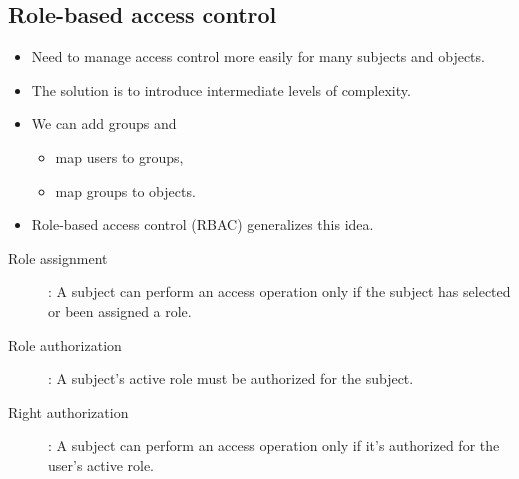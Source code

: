 \subsection{Role-based access control}

\begin{frame}
  \begin{idea}
    \begin{itemize}
      \item Need to manage access control more easily for many subjects and 
        objects.

      \item The solution is to introduce intermediate levels of complexity.

        \pause

      \item We can add groups and
        \begin{itemize}
          \item map users to groups,
          \item map groups to objects.
        \end{itemize}
    \end{itemize}
  \end{idea}
\end{frame}

\begin{frame}
  \begin{remark}
    \begin{itemize}
      \item Role-based access control (RBAC) generalizes this idea.
    \end{itemize}
  \end{remark}
  
  \begin{definition}[RBAC]
    \begin{description}
      \item[Role assignment]: A subject can perform an access operation only if 
        the subject has selected or been assigned a role.

      \item[Role authorization]: A subject's active role must be authorized for 
        the subject.

      \item[Right authorization]: A subject can perform an access operation 
        only if it's authorized for the user's active role.
    \end{description}
  \end{definition}
\end{frame}

